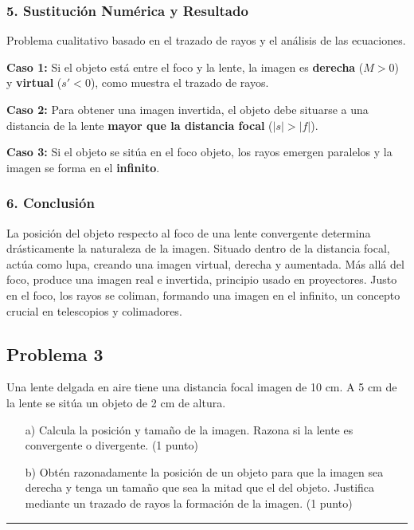 \subsubsection*{5. Sustitución Numérica y Resultado}
Problema cualitativo basado en el trazado de rayos y el análisis de las ecuaciones.
\begin{cajaresultado}
    \textbf{Caso 1:} Si el objeto está entre el foco y la lente, la imagen es \textbf{derecha} ($M>0$) y \textbf{virtual} ($s'<0$), como muestra el trazado de rayos.
\end{cajaresultado}
\begin{cajaresultado}
    \textbf{Caso 2:} Para obtener una imagen invertida, el objeto debe situarse a una distancia de la lente \textbf{mayor que la distancia focal} ($|s| > |f|$).
\end{cajaresultado}
\begin{cajaresultado}
    \textbf{Caso 3:} Si el objeto se sitúa en el foco objeto, los rayos emergen paralelos y la imagen se forma en el \textbf{infinito}.
\end{cajaresultado}

\subsubsection*{6. Conclusión}
\begin{cajaconclusion}
La posición del objeto respecto al foco de una lente convergente determina drásticamente la naturaleza de la imagen. Situado dentro de la distancia focal, actúa como lupa, creando una imagen virtual, derecha y aumentada. Más allá del foco, produce una imagen real e invertida, principio usado en proyectores. Justo en el foco, los rayos se coliman, formando una imagen en el infinito, un concepto crucial en telescopios y colimadores.
\end{cajaconclusion}

\newpage

\subsection{Problema 3}
\label{subsec:P3_2023_jul_ord}

\begin{cajaenunciado}
Una lente delgada en aire tiene una distancia focal imagen de 10 cm. A 5 cm de la lente se sitúa un objeto de 2 cm de altura.
\begin{enumerate}
    \item[a)] Calcula la posición y tamaño de la imagen. Razona si la lente es convergente o divergente. (1 punto)
    \item[b)] Obtén razonadamente la posición de un objeto para que la imagen sea derecha y tenga un tamaño que sea la mitad que el del objeto. Justifica mediante un trazado de rayos la formación de la imagen. (1 punto)
\end{enumerate}
\end{cajaenunciado}
\hrule

